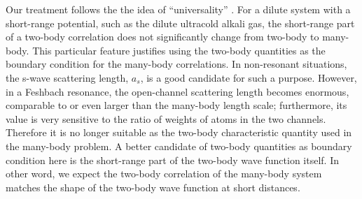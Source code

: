\documentclass[reprint,pra]{revtex4-1}
\begin{document}
  Our treatment follows the the  idea of ``universality'' \cite{Tan2008-1,shizhongUniv}.  For a dilute system with a short-range potential, such as the dilute ultracold alkali gas, the short-range part of a two-body correlation does not significantly change from two-body  to many-body.  This particular feature justifies using the two-body quantities  as the boundary condition for the many-body correlations.  In non-resonant situations, the s-wave scattering length, $a_s$, is a good candidate for such a purpose.  However, in a Feshbach resonance, the open-channel scattering length becomes enormous, comparable to or even larger than the many-body length scale; furthermore, its value is very sensitive to the ratio of weights of atoms in the two channels.  Therefore it is no longer suitable as the two-body characteristic quantity used in  the many-body problem. A better candidate of two-body quantities as boundary condition here is the short-range part of the two-body wave function itself.  In other word, we expect the two-body correlation of the many-body system matches the shape of the two-body wave function  at short distances.  
  
\end{document}
